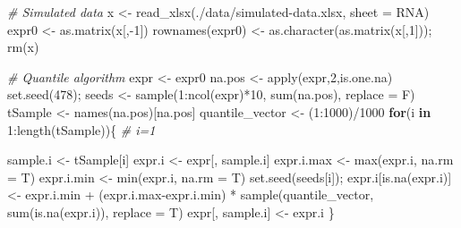 \documentclass[
  12pt,
]{book}
\newenvironment{Shaded}{\begin{snugshade}}{\end{snugshade}}
\newcommand{\AttributeTok}[1]{\textcolor[rgb]{0.77,0.63,0.00}{#1}}
\newcommand{\CommentTok}[1]{\textcolor[rgb]{0.56,0.35,0.01}{\textit{#1}}}
\newcommand{\ControlFlowTok}[1]{\textcolor[rgb]{0.13,0.29,0.53}{\textbf{#1}}}
\newcommand{\DecValTok}[1]{\textcolor[rgb]{0.00,0.00,0.81}{#1}}
\newcommand{\FunctionTok}[1]{\textcolor[rgb]{0.00,0.00,0.00}{#1}}
\newcommand{\NormalTok}[1]{#1}
\newcommand{\OtherTok}[1]{\textcolor[rgb]{0.56,0.35,0.01}{#1}}
\newcommand{\SpecialCharTok}[1]{\textcolor[rgb]{0.00,0.00,0.00}{#1}}
\newcommand{\StringTok}[1]{\textcolor[rgb]{0.31,0.60,0.02}{#1}}
\begin{document}
\begin{Shaded}
\begin{Highlighting}[]
\CommentTok{\# Simulated data}
\NormalTok{x }\OtherTok{\textless{}{-}} \FunctionTok{read\_xlsx}\NormalTok{(}\StringTok{\textquotesingle{}./data/simulated{-}data.xlsx\textquotesingle{}}\NormalTok{, }\AttributeTok{sheet =} \StringTok{\textquotesingle{}RNA\textquotesingle{}}\NormalTok{)}
\NormalTok{expr0 }\OtherTok{\textless{}{-}} \FunctionTok{as.matrix}\NormalTok{(x[,}\SpecialCharTok{{-}}\DecValTok{1}\NormalTok{])}
\FunctionTok{rownames}\NormalTok{(expr0) }\OtherTok{\textless{}{-}} \FunctionTok{as.character}\NormalTok{(}\FunctionTok{as.matrix}\NormalTok{(x[,}\DecValTok{1}\NormalTok{])); }\FunctionTok{rm}\NormalTok{(x)}

\CommentTok{\# Quantile algorithm}
\NormalTok{expr }\OtherTok{\textless{}{-}}\NormalTok{ expr0}
\NormalTok{na.pos }\OtherTok{\textless{}{-}} \FunctionTok{apply}\NormalTok{(expr,}\DecValTok{2}\NormalTok{,is.one.na)}
\FunctionTok{set.seed}\NormalTok{(}\DecValTok{478}\NormalTok{); seeds }\OtherTok{\textless{}{-}} \FunctionTok{sample}\NormalTok{(}\DecValTok{1}\SpecialCharTok{:}\FunctionTok{ncol}\NormalTok{(expr)}\SpecialCharTok{*}\DecValTok{10}\NormalTok{, }\FunctionTok{sum}\NormalTok{(na.pos), }\AttributeTok{replace =}\NormalTok{ F)}
\NormalTok{tSample }\OtherTok{\textless{}{-}} \FunctionTok{names}\NormalTok{(na.pos)[na.pos]}
\NormalTok{quantile\_vector }\OtherTok{\textless{}{-}}\NormalTok{ (}\DecValTok{1}\SpecialCharTok{:}\DecValTok{1000}\NormalTok{)}\SpecialCharTok{/}\DecValTok{1000}
\ControlFlowTok{for}\NormalTok{(i }\ControlFlowTok{in} \DecValTok{1}\SpecialCharTok{:}\FunctionTok{length}\NormalTok{(tSample))\{ }\CommentTok{\# i=1}
  
\NormalTok{  sample.i }\OtherTok{\textless{}{-}}\NormalTok{ tSample[i]}
\NormalTok{  expr.i }\OtherTok{\textless{}{-}}\NormalTok{ expr[, sample.i]}
\NormalTok{  expr.i.max }\OtherTok{\textless{}{-}} \FunctionTok{max}\NormalTok{(expr.i, }\AttributeTok{na.rm =}\NormalTok{ T)}
\NormalTok{  expr.i.min }\OtherTok{\textless{}{-}} \FunctionTok{min}\NormalTok{(expr.i, }\AttributeTok{na.rm =}\NormalTok{ T)}
  \FunctionTok{set.seed}\NormalTok{(seeds[i]);}
\NormalTok{  expr.i[}\FunctionTok{is.na}\NormalTok{(expr.i)] }\OtherTok{\textless{}{-}}
\NormalTok{    expr.i.min }\SpecialCharTok{+}
\NormalTok{    (expr.i.max}\SpecialCharTok{{-}}\NormalTok{expr.i.min) }\SpecialCharTok{*} \FunctionTok{sample}\NormalTok{(quantile\_vector,}
                                     \FunctionTok{sum}\NormalTok{(}\FunctionTok{is.na}\NormalTok{(expr.i)),}
                                     \AttributeTok{replace =}\NormalTok{ T)}
\NormalTok{  expr[, sample.i] }\OtherTok{\textless{}{-}}\NormalTok{ expr.i}
\NormalTok{\}}
  


\end{Highlighting}
\end{Shaded}
\end{document}
